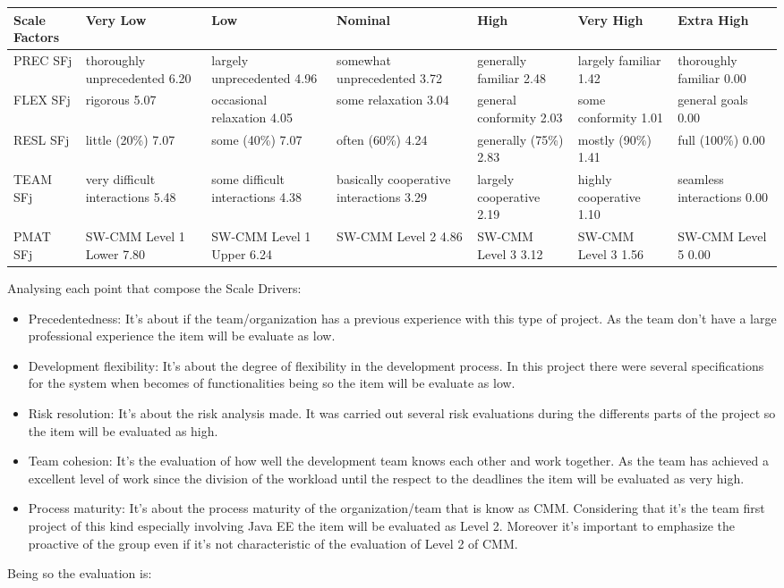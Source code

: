 \documentclass[a4paper]{article}
\begin{document}
\begin{tabular}{ | L{1.5cm} | L{3cm} | L{3cm} | L{3cm} | L{3cm} | L{3cm} | L{3cm} |}

\hline
	\textbf {Scale Factors} & \textbf {Very Low} & \textbf {Low} & \textbf {Nominal} & \textbf {High} & \textbf {Very High} & \textbf {Extra High} \\ \hline
	PREC  SFj  & thoroughly unprecedented 6.20 & largely unprecedented 4.96 & somewhat unprecedented 3.72 & generally familiar 2.48 & largely familiar 1.42& thoroughly familiar 0.00  \\ \hline
	FLEX SFj  &rigorous 5.07 &occasional relaxation 4.05 &some relaxation 3.04 &general conformity 2.03 & some conformity 1.01& general goals 0.00  \\ \hline
	RESL SFj  &little (20\%) 7.07&some (40\%) 7.07 & often (60\%) 4.24& generally (75\%) 2.83&mostly
(90\%) 1.41&full (100\%) 0.00\\ \hline
	TEAM SFj  &very difficult interactions 5.48 &some difficult interactions 4.38 &basically cooperative interactions 3.29 & largely cooperative 2.19 & highly cooperative 1.10& seamless interactions 0.00  \\ \hline
	PMAT SFj  &SW-CMM Level 1 Lower 7.80&SW-CMM Level 1 Upper 6.24&SW-CMM Level 2 4.86&SW-CMM Level 3 3.12&SW-CMM Level 3  1.56&SW-CMM Level 5  0.00\\ \hline
\end{tabular}
\newpage
Analysing each point that compose the Scale Drivers:
\begin{itemize}
\item Precedentedness: It's about if the team/organization has a previous experience with this type of project. As the team don't have a large professional experience the item will be evaluate as low.
\item Development flexibility: It's about the degree of flexibility in the development process. In this project there were several specifications for the system when becomes of functionalities being so the item will be evaluate as low.
\item Risk resolution: It's about the risk analysis made. It was carried out several risk evaluations during the differents parts of the project so the item will be evaluated as high.
\item Team cohesion: It's the evaluation of how well the development team knows each other and work together. As the team has achieved a excellent level of work since the division of the workload until the respect to the deadlines the item will be evaluated as very high.
\item Process maturity: It's about the process maturity of the organization/team that is know as CMM. Considering that it's the team first project of this kind especially involving Java EE the item will be evaluated as Level 2. Moreover it's important to emphasize the proactive of the group even if it's not characteristic of the evaluation of Level 2 of CMM. 
\end{itemize}
Being so the evaluation is:
\end{document}
